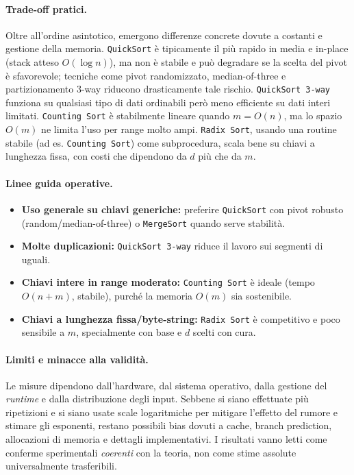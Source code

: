 \documentclass[a4paper, 11pt]{article}
\begin{document}
\paragraph{Trade-off pratici.}
Oltre all'ordine asintotico, emergono differenze concrete dovute a costanti e gestione della memoria. 
\texttt{QuickSort} è tipicamente il più rapido in media e in-place (stack atteso \(O(\log n)\)), ma non è stabile e può degradare se la scelta del pivot è sfavorevole; tecniche come pivot randomizzato, median-of-three e partizionamento 3-way riducono drasticamente tale rischio. 
\texttt{QuickSort 3-way} funziona su qualsiasi tipo di dati ordinabili però meno efficiente su dati interi limitati. 
\texttt{Counting Sort} è stabilmente lineare quando \(m=O(n)\), ma lo spazio \(O(m)\) ne limita l'uso per range molto ampi. 
\texttt{Radix Sort}, usando una routine stabile (ad es. \texttt{Counting Sort}) come subprocedura, scala bene su chiavi a lunghezza fissa, con costi che dipendono da \(d\) più che da \(m\).

\paragraph{Linee guida operative.}
\begin{itemize}
  \item \textbf{Uso generale su chiavi generiche:} preferire \texttt{QuickSort} con pivot robusto (random/median-of-three) o \texttt{MergeSort} quando serve stabilità.
  \item \textbf{Molte duplicazioni:} \texttt{QuickSort 3-way} riduce il lavoro sui segmenti di uguali.
  \item \textbf{Chiavi intere in range moderato:} \texttt{Counting Sort} è ideale (tempo \(O(n+m)\), stabile), purché la memoria \(O(m)\) sia sostenibile.
  \item \textbf{Chiavi a lunghezza fissa/byte-string:} \texttt{Radix Sort} è competitivo e poco sensibile a \(m\), specialmente con base e \(d\) scelti con cura.
\end{itemize}

\paragraph{Limiti e minacce alla validità.}
Le misure dipendono dall'hardware, dal sistema operativo, dalla gestione del \emph{runtime} e dalla distribuzione degli input. 
Sebbene si siano effettuate più ripetizioni e si siano usate scale logaritmiche per mitigare l'effetto del rumore e stimare gli esponenti, restano possibili bias dovuti a cache, branch prediction, allocazioni di memoria e dettagli implementativi. 
I risultati vanno letti come conferme sperimentali \emph{coerenti} con la teoria, non come stime assolute universalmente trasferibili.
\end{document}
